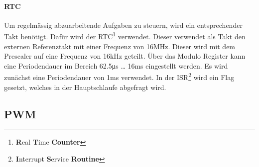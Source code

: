 \paragraph{RTC}$~~$\vspace{2mm}\\
\fi
\label{sec:rtc}
Um regelmässig abzuarbeitende Aufgaben zu steuern, wird ein entsprechender 
Takt benötigt. Dafür wird der RTC\footnote{\textbf{R}eal \textbf{T}ime 
\textbf{Counter}} verwendet. Dieser verwendet als Takt den externen 
Referenztakt mit einer Frequenz von 16\si{\mega\hertz}. Dieser wird mit dem 
Prescaler auf eine Frequenz von 16\si{\kilo\hertz} geteilt. Über das Modulo 
Register kann eine Periodendauer im Bereich 62.5\si{\micro\second} \ldots 
16\si{\milli\second} eingestellt werden. Es wird zunächst eine Periodendauer 
von 1\si{\milli\second} verwendet. In der ISR\footnote{\textbf{I}nterrupt 
\textbf{S}ervice \textbf{Routine}} wird ein Flag gesetzt, welches in der 
Hauptschlaufe abgefragt wird. 

\ifSTANDALONE
\subsection{PWM}
\fi
\ifEMBED
